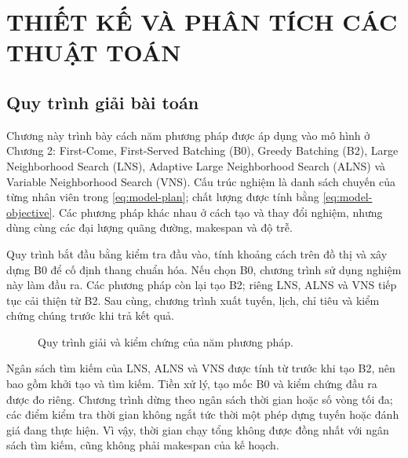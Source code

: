 \section{THIẾT KẾ VÀ PHÂN TÍCH CÁC THUẬT TOÁN}
\label{sec:chuong3}

\subsection{Quy trình giải bài toán}
Chương này trình bày cách năm phương pháp được áp dụng vào mô hình ở Chương 2: First-Come, First-Served Batching (B0), Greedy Batching (B2), Large Neighborhood Search (LNS), Adaptive Large Neighborhood Search (ALNS) và Variable Neighborhood Search (VNS). Cấu trúc nghiệm là danh sách chuyến của từng nhân viên trong \eqref{eq:model-plan}; chất lượng được tính bằng \eqref{eq:model-objective}. Các phương pháp khác nhau ở cách tạo và thay đổi nghiệm, nhưng dùng cùng các đại lượng quãng đường, makespan và độ trễ.

Quy trình bắt đầu bằng kiểm tra đầu vào, tính khoảng cách trên đồ thị và xây dựng B0 để cố định thang chuẩn hóa. Nếu chọn B0, chương trình sử dụng nghiệm này làm đầu ra. Các phương pháp còn lại tạo B2; riêng LNS, ALNS và VNS tiếp tục cải thiện từ B2. Sau cùng, chương trình xuất tuyến, lịch, chỉ tiêu và kiểm chứng chúng trước khi trả kết quả.

\begin{figure}[H]
\centering
{}
\caption{Quy trình giải và kiểm chứng của năm phương pháp.}\label{fig:solver-flow}
\end{figure}

Ngân sách tìm kiếm của LNS, ALNS và VNS được tính từ trước khi tạo B2, nên bao gồm khởi tạo và tìm kiếm. Tiền xử lý, tạo mốc B0 và kiểm chứng đầu ra được đo riêng. Chương trình dừng theo ngân sách thời gian hoặc số vòng tối đa; các điểm kiểm tra thời gian không ngắt tức thời một phép dựng tuyến hoặc đánh giá đang thực hiện. Vì vậy, thời gian chạy tổng không được đồng nhất với ngân sách tìm kiếm, cũng không phải makespan của kế hoạch.

